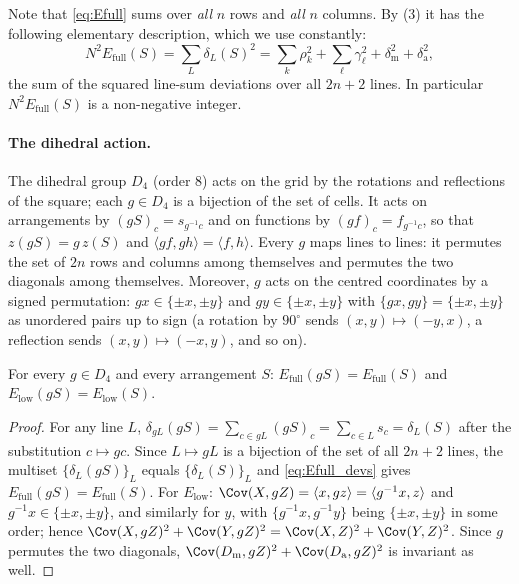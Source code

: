 Note that \eqref{eq:Efull} sums over \emph{all} $n$ rows and \emph{all} $n$ columns.
By (3) it has the following elementary description, which we use constantly:
\begin{equation}
N^{2}E_{\mathrm{full}}(S)=\sum_{L}\delta_L(S)^{2}
=\sum_k\rho_k^{2}+\sum_\ell\gamma_\ell^{2}+\delta_{\mathrm m}^{2}+\delta_{\mathrm a}^{2},
\label{eq:Efull_devs}
\end{equation}
the sum of the squared line-sum deviations over all $2n+2$ lines.  In particular $N^{2}E_{\mathrm{full}}(S)$ is a
non-negative integer.

\paragraph{The dihedral action.}
The dihedral group $D_4$ (order $8$) acts on the grid by the rotations and reflections of the square;
each $g\in D_4$ is a bijection of the set of cells.  It acts on arrangements by $(gS)_c=s_{g^{-1}c}$
and on functions by $(gf)_c=f_{g^{-1}c}$, so that $z(gS)=g\,z(S)$ and $\langle gf,gh\rangle=\langle f,h\rangle$.
Every $g$ maps lines to lines: it permutes the set of $2n$ rows and columns among themselves and
permutes the two diagonals among themselves.  Moreover, $g$ acts on the centred coordinates by
a signed permutation: $gx\in\{\pm x,\pm y\}$ and $gy\in\{\pm x,\pm y\}$ with $\{gx,gy\}=\{\pm x,\pm y\}$
as unordered pairs up to sign (a rotation by $90^\circ$ sends $(x,y)\mapsto(-y,x)$, a reflection
sends $(x,y)\mapsto(-x,y)$, and so on).

\begin{proposition}
\label{prop:d4_energy}
For every $g\in D_4$ and every arrangement $S$: $E_{\mathrm{full}}(gS)=E_{\mathrm{full}}(S)$ and
$E_{\mathrm{low}}(gS)=E_{\mathrm{low}}(S)$.
\end{proposition}

\begin{proof}
For any line $L$, $\delta_{gL}(gS)=\sum_{c\in gL}(gS)_c=\sum_{c\in L}s_{c}=\delta_L(S)$ after the
substitution $c\mapsto gc$.  Since $L\mapsto gL$ is a bijection of the set of all $2n+2$ lines,
the multiset $\{\delta_L(gS)\}_L$ equals $\{\delta_L(S)\}_L$ and \eqref{eq:Efull_devs} gives
$E_{\mathrm{full}}(gS)=E_{\mathrm{full}}(S)$.
For $E_{\mathrm{low}}$: $\Cov(X,gZ)=\langle x,gz\rangle=\langle g^{-1}x,z\rangle$ and $g^{-1}x\in\{\pm x,\pm y\}$,
and similarly for $y$, with $\{g^{-1}x,g^{-1}y\}$ being $\{\pm x,\pm y\}$ in some order; hence
$\Cov(X,gZ)^{2}+\Cov(Y,gZ)^{2}=\Cov(X,Z)^{2}+\Cov(Y,Z)^{2}$.  Since $g$ permutes the two diagonals,
$\Cov(D_{\mathrm m},gZ)^{2}+\Cov(D_{\mathrm a},gZ)^{2}$ is invariant as well.
\end{proof}

